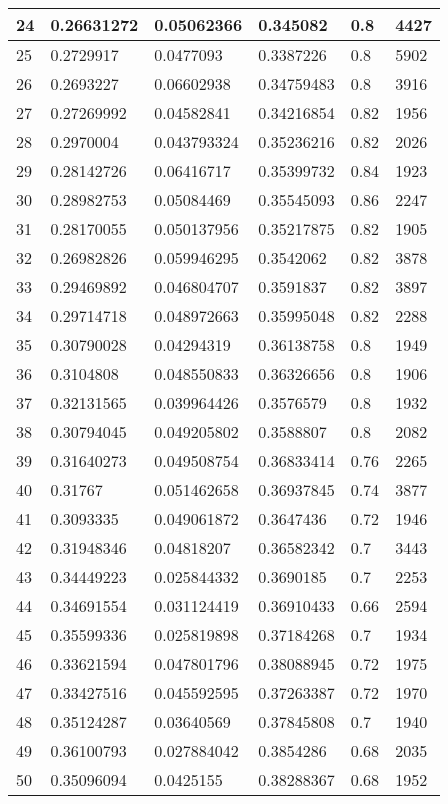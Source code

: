 \begin{longtable}{|l|l|l|l|l|l|}
24 & 0.26631272 & 0.05062366 & 0.345082 & 0.8 & 4427 \\ \hline 
25 & 0.2729917 & 0.0477093 & 0.3387226 & 0.8 & 5902 \\ \hline 
26 & 0.2693227 & 0.06602938 & 0.34759483 & 0.8 & 3916 \\ \hline 
27 & 0.27269992 & 0.04582841 & 0.34216854 & 0.82 & 1956 \\ \hline 
28 & 0.2970004 & 0.043793324 & 0.35236216 & 0.82 & 2026 \\ \hline 
29 & 0.28142726 & 0.06416717 & 0.35399732 & 0.84 & 1923 \\ \hline 
30 & 0.28982753 & 0.05084469 & 0.35545093 & 0.86 & 2247 \\ \hline 
31 & 0.28170055 & 0.050137956 & 0.35217875 & 0.82 & 1905 \\ \hline 
32 & 0.26982826 & 0.059946295 & 0.3542062 & 0.82 & 3878 \\ \hline 
33 & 0.29469892 & 0.046804707 & 0.3591837 & 0.82 & 3897 \\ \hline 
34 & 0.29714718 & 0.048972663 & 0.35995048 & 0.82 & 2288 \\ \hline 
35 & 0.30790028 & 0.04294319 & 0.36138758 & 0.8 & 1949 \\ \hline 
36 & 0.3104808 & 0.048550833 & 0.36326656 & 0.8 & 1906 \\ \hline 
37 & 0.32131565 & 0.039964426 & 0.3576579 & 0.8 & 1932 \\ \hline 
38 & 0.30794045 & 0.049205802 & 0.3588807 & 0.8 & 2082 \\ \hline 
39 & 0.31640273 & 0.049508754 & 0.36833414 & 0.76 & 2265 \\ \hline 
40 & 0.31767 & 0.051462658 & 0.36937845 & 0.74 & 3877 \\ \hline 
41 & 0.3093335 & 0.049061872 & 0.3647436 & 0.72 & 1946 \\ \hline 
42 & 0.31948346 & 0.04818207 & 0.36582342 & 0.7 & 3443 \\ \hline 
43 & 0.34449223 & 0.025844332 & 0.3690185 & 0.7 & 2253 \\ \hline 
44 & 0.34691554 & 0.031124419 & 0.36910433 & 0.66 & 2594 \\ \hline 
45 & 0.35599336 & 0.025819898 & 0.37184268 & 0.7 & 1934 \\ \hline 
46 & 0.33621594 & 0.047801796 & 0.38088945 & 0.72 & 1975 \\ \hline 
47 & 0.33427516 & 0.045592595 & 0.37263387 & 0.72 & 1970 \\ \hline 
48 & 0.35124287 & 0.03640569 & 0.37845808 & 0.7 & 1940 \\ \hline 
49 & 0.36100793 & 0.027884042 & 0.3854286 & 0.68 & 2035 \\ \hline 
50 & 0.35096094 & 0.0425155 & 0.38288367 & 0.68 & 1952 \\ \hline 
\end{longtable}